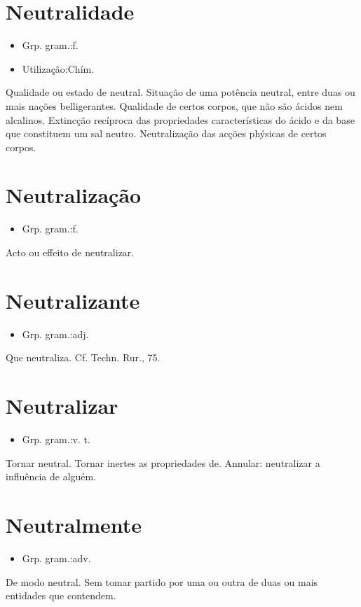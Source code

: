 \section{Neutralidade}
\begin{itemize}
\item {Grp. gram.:f.}
\end{itemize}
\begin{itemize}
\item {Utilização:Chím.}
\end{itemize}
Qualidade ou estado de neutral.
Situação de uma potência neutral, entre duas ou mais nações belligerantes.
Qualidade de certos corpos, que não são ácidos nem alcalinos.
Extincção recíproca das propriedades características do ácido e da base que constituem um sal neutro.
Neutralização das acções phýsicas de certos corpos.
\section{Neutralização}
\begin{itemize}
\item {Grp. gram.:f.}
\end{itemize}
Acto ou effeito de neutralizar.
\section{Neutralizante}
\begin{itemize}
\item {Grp. gram.:adj.}
\end{itemize}
Que neutraliza. Cf. \textunderscore Techn. Rur.\textunderscore , 75.
\section{Neutralizar}
\begin{itemize}
\item {Grp. gram.:v. t.}
\end{itemize}
Tornar neutral.
Tornar inertes as propriedades de.
Annular: \textunderscore neutralizar a influência de alguém\textunderscore .
\section{Neutralmente}
\begin{itemize}
\item {Grp. gram.:adv.}
\end{itemize}
De modo neutral.
Sem tomar partido por uma ou outra de duas ou mais entidades que contendem.
